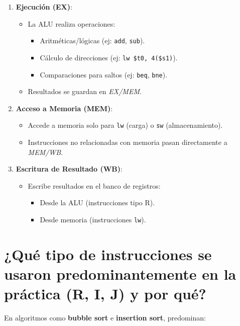 \documentclass{article}
\begin{document}
\begin{itemize}
\begin{itemize}[label=--]
\begin{enumerate}
  \item \textbf{Ejecución (EX)}:
    \begin{itemize}
      \item La ALU realiza operaciones:
        \begin{itemize}
          \item Aritméticas/lógicas (ej: \texttt{add}, \texttt{sub}).
          \item Cálculo de direcciones (ej: \texttt{lw \$t0, 4(\$s1)}).
          \item Comparaciones para saltos (ej: \texttt{beq}, \texttt{bne}).
        \end{itemize}
      \item Resultados se guardan en \textit{EX/MEM}.
    \end{itemize}
  
  \item \textbf{Acceso a Memoria (MEM)}:
    \begin{itemize}
      \item Accede a memoria solo para \texttt{lw} (carga) o \texttt{sw} (almacenamiento).
      \item Instrucciones no relacionadas con memoria pasan directamente a \textit{MEM/WB}.
    \end{itemize}
  
  \item \textbf{Escritura de Resultado (WB)}:
    \begin{itemize}
      \item Escribe resultados en el banco de registros:
        \begin{itemize}
          \item Desde la ALU (instrucciones tipo R).
          \item Desde memoria (instrucciones \texttt{lw}).
        \end{itemize}
    \end{itemize}
\end{enumerate}

\section{¿Qué tipo de instrucciones se usaron predominantemente en la práctica (R, I, J) y por qué?}

En algoritmos como \textbf{bubble sort} e \textbf{insertion sort}, predominan:


\end{itemize}
\end{itemize}
\end{document}
